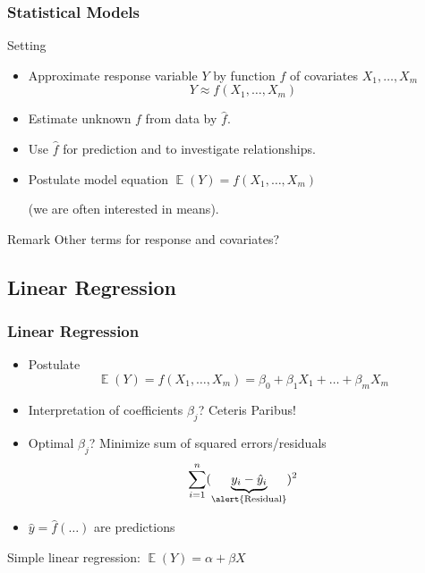 \documentclass[
    utf8,
    aspectratio=169
]{beamer}  %
\DeclareMathOperator{\E}{\mathbb{E}}  %
\begin{document}
\begin{frame}
	\frametitle{Statistical Models}
	\begin{block}{Setting}
		\begin{itemize}
			\item Approximate \alert{response variable} $Y$ by function $f$ of \alert{covariates} $X_1,\dots,X_m$
			$$
				Y \approx f(X_1,\dots,X_m)
			$$
			\item Estimate unknown $f$ from data by $\hat f$.
			\item Use $\hat f$ for prediction and to investigate relationships.
			\item Postulate model equation $\E(Y) = f(X_1, \dots, X_m)$
			
			(we are often interested in means).
		\end{itemize}
	\end{block}
	
	\begin{block}{Remark}
		Other terms for response and covariates?
	\end{block}
\end{frame}

\subsection{Linear Regression}

\begin{frame}
	\frametitle{Linear Regression}
	\begin{itemize}
		\item Postulate 
		$$
			\E(Y) = f(X_1, \dots, X_m)=\beta_0 + \beta_1 X_1 + \dots + \beta_m X_m
		$$
		\item Interpretation of coefficients $\beta_j$? Ceteris Paribus!
		\item Optimal $\hat \beta_j$? Minimize sum of squared errors/residuals
		$$
			\sum_{i = 1}^n (\underbrace{y_i - \hat y_i}_{\text{\alert{Residual}}})^2 
		$$
		\item $\hat y = \hat f(\dots)$ are \alert{predictions}
	\end{itemize}

	\vfill
	
	\begin{example}
		Simple linear regression: $\E(Y)=\alpha + \beta X$
	\end{example}
\end{frame}
\end{document}
